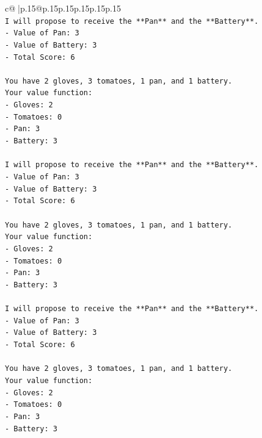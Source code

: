 \documentclass{article}
\begin{document}
{\begin{supertabular}{c@{$\;$}|p{.15\linewidth}@{}p{.15\linewidth}p{.15\linewidth}p{.15\linewidth}p{.15\linewidth}p{.15\linewidth}}
{{{\\ 
\texttt{I will propose to receive the **Pan** and the **Battery**.} \\
\texttt{{-} Value of Pan: 3} \\
\texttt{{-} Value of Battery: 3} \\
\texttt{{-} Total Score: 6} \\
\\ 
\texttt{You have 2 gloves, 3 tomatoes, 1 pan, and 1 battery.} \\
\texttt{Your value function:} \\
\texttt{{-} Gloves: 2} \\
\texttt{{-} Tomatoes: 0} \\
\texttt{{-} Pan: 3} \\
\texttt{{-} Battery: 3} \\
\\ 
\texttt{I will propose to receive the **Pan** and the **Battery**.} \\
\texttt{{-} Value of Pan: 3} \\
\texttt{{-} Value of Battery: 3} \\
\texttt{{-} Total Score: 6} \\
\\ 
\texttt{You have 2 gloves, 3 tomatoes, 1 pan, and 1 battery.} \\
\texttt{Your value function:} \\
\texttt{{-} Gloves: 2} \\
\texttt{{-} Tomatoes: 0} \\
\texttt{{-} Pan: 3} \\
\texttt{{-} Battery: 3} \\
\\ 
\texttt{I will propose to receive the **Pan** and the **Battery**.} \\
\texttt{{-} Value of Pan: 3} \\
\texttt{{-} Value of Battery: 3} \\
\texttt{{-} Total Score: 6} \\
\\ 
\texttt{You have 2 gloves, 3 tomatoes, 1 pan, and 1 battery.} \\
\texttt{Your value function:} \\
\texttt{{-} Gloves: 2} \\
\texttt{{-} Tomatoes: 0} \\
\texttt{{-} Pan: 3} \\
\texttt{{-} Battery: 3} \\
\\ 
}}}
\end{supertabular}}
\end{document}
